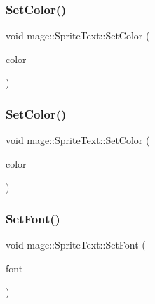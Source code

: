 \hypertarget{classmage_1_1_sprite_text_acaeb6686d0a5d89d799dd3ac4390a242}{}\label{classmage_1_1_sprite_text_acaeb6686d0a5d89d799dd3ac4390a242} 
\subsubsection{\texorpdfstring{Set\+Color()}{SetColor()}\hspace{0.1cm}{\footnotesize\ttfamily [1/2]}}
{\footnotesize\ttfamily void mage\+::\+Sprite\+Text\+::\+Set\+Color (\begin{DoxyParamCaption}\item[{const \hyperlink{structmage_1_1_color}{Color} \&}]{color }\end{DoxyParamCaption})}

\hypertarget{classmage_1_1_sprite_text_ab3930318d6dca0589de4490ed629a3b8}{}\label{classmage_1_1_sprite_text_ab3930318d6dca0589de4490ed629a3b8} 
\subsubsection{\texorpdfstring{Set\+Color()}{SetColor()}\hspace{0.1cm}{\footnotesize\ttfamily [2/2]}}
{\footnotesize\ttfamily void mage\+::\+Sprite\+Text\+::\+Set\+Color (\begin{DoxyParamCaption}\item[{const X\+M\+V\+E\+C\+T\+OR \&}]{color }\end{DoxyParamCaption})}

\hypertarget{classmage_1_1_sprite_text_a8e753dcd210b1fdf9c5399a9f0f3415d}{}\label{classmage_1_1_sprite_text_a8e753dcd210b1fdf9c5399a9f0f3415d} 
\subsubsection{\texorpdfstring{Set\+Font()}{SetFont()}}
{\footnotesize\ttfamily void mage\+::\+Sprite\+Text\+::\+Set\+Font (\begin{DoxyParamCaption}\item[{\hyperlink{namespacemage_a1e01ae66713838a7a67d30e44c67703e}{Shared\+Ptr}$<$ \hyperlink{classmage_1_1_sprite_font}{Sprite\+Font} $>$}]{font }\end{DoxyParamCaption})}

